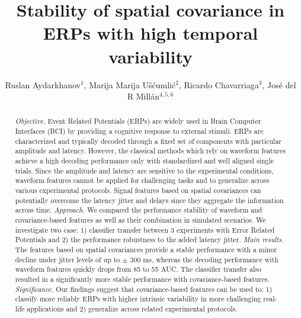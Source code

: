 \documentclass[12pt]{iopart}
\begin{document}
\title[]{Stability of spatial covariance in ERPs with high temporal variability}

\author{Ruslan Aydarkhanov$^1$,
Marija Marija U\v{s}\'{c}umli\'{c}$^2$,
Ricardo Chavarriaga$^3$,
Jos\'e del R Mill\'an$^{4,5,6}$}


\address{$^1$Medical Image Processing Laboratory,
Center for Neuroprosthetics,
Interschool Institute of Bioengineering,
\'Ecole Polytechnique F\'ed\'erale de Lausanne (EPFL),
Campus Biotech H4,
1202 Geneva,
Switzerland}
\address{$^2$Nissan International SA,
La Pi\`ece 12,
1180 Rolle,
Switzerland
}
\address{$^3$Zürich University of Applied Sciences, ZHAW,
InIT Institut of Applied Information Technology,
Ob. Kirchgasse 2,
8400 Winterthur,
Switzerland}
\address{$^4$Dept. of Electrical and Computer Engineering,
The University of Texas at Austin,
Austin, TX 78712,
USA}
\address{$^5$Dept. of Neurology,
The University of Texas at Austin,
Austin, TX 78712,
USA}
\address{$^6$\'Ecole Polytechnique F\'ed\'erale de Lausanne (EPFL),
Campus Biotech H4,
1202 Geneva,
 Switzerland}
\vspace{10pt}

\begin{abstract}
\textit{Objective.} Event Related Potentials (ERPs) are widely used in Brain Computer
Interfaces (BCI) by providing a cognitive response to external stimuli.
ERPs are characterized and typically decoded through a fixed set of
components with particular amplitude and latency. 
However, the classical methods which rely on waveform features
achieve a high decoding performance only with standardized
and well aligned single trials. Since the amplitude and latency
are sensitive to the experimental conditions,
waveform features cannot be applied for challenging tasks and
to generalize across various experimental protocols.
Signal features based on spatial covariances can potentially overcome
the latency jitter and delays since they aggregate the information
across time.
\textit{Approach.} We compared the performance stability 
of waveform and covariance-based features as well as their combination
in simulated scenarios. We investigate two case: 1) classifier transfer 
between 3 experiments with Error Related Potentials
and 2) the performance robustness to the added latency jitter.
\textit{Main results.} The features based on spatial covariances
provide a stable performance with a minor decline
under jitter levels of up to $\pm$ 300 ms,
whereas the decoding performance with waveform features
quickly drops from 85 to 55 AUC. The classifier transfer also
resulted in a significantly more stable performance with covariance-based
features.
\textit{Significance.} Our findings suggest that covariance-based features
can be used to: 1) classify more reliably ERPs
with higher intrinsic variability in more challenging real-life applications
and 2) generalize across related experimental protocols.
\end{abstract}
\end{document}
